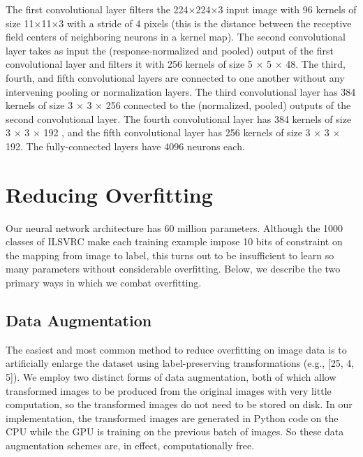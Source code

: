 \documentclass[12pt,a4paper,UTF8,twoside]{book}
\begin{document}
The first convolutional layer filters the 224×224×3 input image with 96 kernels of size 11×11×3 with a stride of 4 pixels (this is the distance between the receptive field centers of neighboring neurons in a kernel map). The second convolutional layer takes as input the (response-normalized and pooled) output of the first convolutional layer and filters it with 256 kernels of size 5 × 5 × 48. The third, fourth, and fifth convolutional layers are connected to one another without any intervening pooling or normalization layers. The third convolutional layer has 384 kernels of size 3 × 3 × 256 connected to the (normalized, pooled) outputs of the second convolutional layer. The fourth convolutional layer has 384 kernels of size 3 × 3 × 192 , and the fifth convolutional layer has 256 kernels of size 3 × 3 × 192. The fully-connected layers have 4096 neurons each.

\hypertarget{reducing-overfitting}{%
\section{Reducing Overfitting}\label{reducing-overfitting}}

Our neural network architecture has 60 million parameters. Although the 1000 classes of ILSVRC make each training example impose 10 bits of constraint on the mapping from image to label, this turns out to be insufficient to learn so many parameters without considerable overfitting. Below, we describe the two primary ways in which we combat overfitting.

\hypertarget{data-augmentation}{%
\subsection{Data Augmentation}\label{data-augmentation}}

The easiest and most common method to reduce overfitting on image data is to artificially enlarge the dataset using label-preserving transformations (e.g., {[}25, 4, 5{]}). We employ two distinct forms of data augmentation, both of which allow transformed images to be produced from the original images with very little computation, so the transformed images do not need to be stored on disk. In our implementation, the transformed images are generated in Python code on the CPU while the GPU is training on the previous batch of images. So these data augmentation schemes are, in effect, computationally free.
\end{document}
